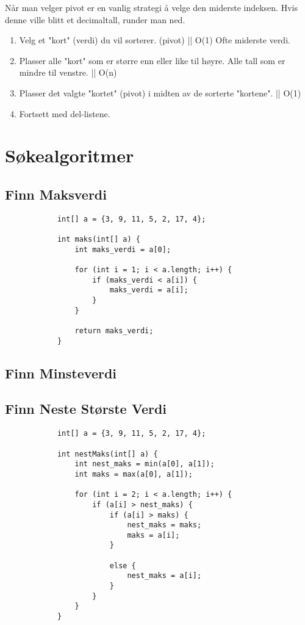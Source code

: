 \documentclass[11pt]{article}
\begin{document}
Når man velger pivot er en vanlig strategi å velge den miderste indeksen.
Hvis denne ville blitt et decimaltall, runder man ned.

\begin{enumerate}
	\item Velg et "kort" (verdi) du vil sorterer. (pivot) || O(1)
	      \subitem Ofte miderste verdi.
	\item Plasser alle "kort" som er større enn eller like til høyre.
	      Alle tall som er mindre til venstre. || O(n)
	\item Plasser det valgte "kortet" (pivot) i midten av de sorterte "kortene". || O(1)
	\item Fortsett med del-listene.
\end{enumerate}

\newpage
\section{Søkealgoritmer}

\subsection{Finn Maksverdi}
\begin{lstlisting}
			int[] a = {3, 9, 11, 5, 2, 17, 4};

			int maks(int[] a) {
				int maks_verdi = a[0];

				for (int i = 1; i < a.length; i++) {
					if (maks_verdi < a[i]) {
						maks_verdi = a[i];
					}
				}

				return maks_verdi;
			}
		\end{lstlisting}

\subsection{Finn Minsteverdi}


\subsection{Finn Neste Største Verdi}
\begin{lstlisting}
			int[] a = {3, 9, 11, 5, 2, 17, 4};
			
			int nestMaks(int[] a) {
				int nest_maks = min(a[0], a[1]);
				int maks = max(a[0], a[1]);

				for (int i = 2; i < a.length; i++) {
					if (a[i] > nest_maks) {
						if (a[i] > maks) {
							nest_maks = maks;
							maks = a[i];
						}

						else {
							nest_maks = a[i];
						}
					}
				}
			}
		\end{lstlisting}
\end{document}
